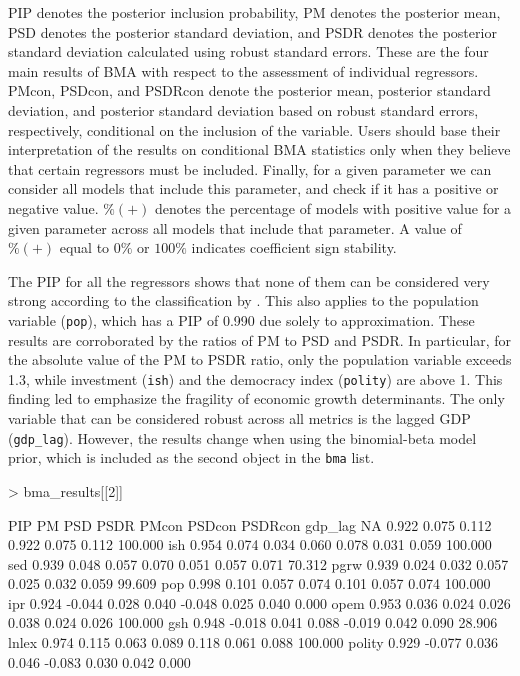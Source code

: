 \documentclass[a4paper]{article}
\begin{document}
PIP denotes the posterior inclusion probability, PM denotes the posterior mean, PSD denotes the posterior standard deviation, and PSDR denotes the posterior standard deviation calculated using robust standard errors.
These are the four main results of BMA with respect to the assessment of individual regressors.
PMcon, PSDcon, and PSDRcon denote the posterior mean, posterior standard deviation, and posterior standard deviation based on robust standard errors, respectively, conditional on the inclusion of the variable.
Users should base their interpretation of the results on conditional BMA statistics
only when they believe that certain regressors must be included.
Finally, for a given parameter we can consider all models that include this parameter,
and check if it has a positive or negative value.
$\%(+)$ denotes the percentage of models with positive value for a given parameter across all models that include that parameter.
A value of $\%(+)$ equal to $0\%$ or $100\%$ indicates coefficient sign stability.

The PIP for all the regressors shows that none of them can be considered very strong according to the classification by \citet{Raftery+1995}.
This also applies to the population variable (\verb+pop+), which has a PIP of 0.990 due solely to approximation.
These results are corroborated by the ratios of PM to PSD and PSDR.
In particular, for the absolute value of the PM to PSDR ratio, only the population variable exceeds 1.3, while investment (\verb+ish+) and the democracy index (\verb+polity+) are above 1.
This finding led \citet{Moral+2016} to emphasize the fragility of economic growth determinants.
The only variable that can be considered robust across all metrics is the lagged GDP (\verb+gdp_lag+).
However, the results change when using the binomial-beta model prior, which is included as the second object in the \verb+bma+ list.

\begin{Schunk}
\begin{Sinput}
> bma_results[[2]]
\end{Sinput}
\begin{Soutput}
          PIP     PM   PSD  PSDR  PMcon PSDcon PSDRcon    %
gdp_lag    NA  0.922 0.075 0.112  0.922  0.075   0.112 100.000
ish     0.954  0.074 0.034 0.060  0.078  0.031   0.059 100.000
sed     0.939  0.048 0.057 0.070  0.051  0.057   0.071  70.312
pgrw    0.939  0.024 0.032 0.057  0.025  0.032   0.059  99.609
pop     0.998  0.101 0.057 0.074  0.101  0.057   0.074 100.000
ipr     0.924 -0.044 0.028 0.040 -0.048  0.025   0.040   0.000
opem    0.953  0.036 0.024 0.026  0.038  0.024   0.026 100.000
gsh     0.948 -0.018 0.041 0.088 -0.019  0.042   0.090  28.906
lnlex   0.974  0.115 0.063 0.089  0.118  0.061   0.088 100.000
polity  0.929 -0.077 0.036 0.046 -0.083  0.030   0.042   0.000
\end{Soutput}
\end{Schunk}
\end{document}

